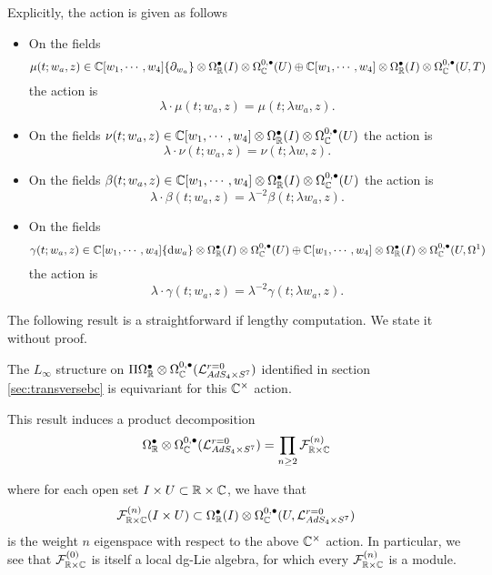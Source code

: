 Explicitly, the action is given as follows 
\begin{itemize}
\item On the fields 
\[
\mu(t; w_a,z) \in \mathbb{C}[w_1, \cdots, w_4]\{\partial_{w_a}\} \otimes \Omega^\bullet_{\mathbb{R}}(I) \otimes \Omega^{0,\bullet}_{\mathbb{C}} (U) \oplus \mathbb{C}[w_1, \cdots, w_4]\otimes \Omega^\bullet_{\mathbb{R}}(I)\otimes \Omega^{0,\bullet}_{\mathbb{C}}(U, T)\] 
the action is
\[
\lambda \cdot \mu(t; w_a,z) = \mu(t; \lambda w_a , z).
\]
\item On the fields $\nu(t; w_a,z) \in \mathbb{C}[w_1, \cdots, w_4] \otimes \Omega^{\bullet}_{\mathbb{R}}(I) \otimes \Omega^{0,\bullet}_{\mathbb{C}}(U)$ the action is
\[
\lambda \cdot \nu(t; w_a,z) = \nu(t; \lambda w , z).
\]
\item On the fields $\beta(t; w_a,z) \in  \mathbb{C}[w_1, \cdots, w_4] \otimes \Omega^{\bullet}_{\mathbb{R}}(I) \otimes \Omega^{0,\bullet}_{\mathbb{C}}(U)$ the action is
\[
\lambda \cdot \beta(t; w_a,z) = \lambda^{-2} \beta(t; \lambda w_a , z).
\]
\item On the fields 
\[
\gamma(t; w_a,z) \in  \mathbb{C}[w_1, \cdots, w_4] \{\mathrm{d} w_a\} \otimes \Omega^{\bullet}_{\mathbb{R}}(I) \otimes\Omega^{0,\bullet}_{\mathbb{C}} (U) \oplus  \mathbb{C}[w_1, \cdots, w_4] \otimes \Omega^{\bullet}_{\mathbb{R}}(I) \otimes\Omega^{0,\bullet}_{\mathbb{C}}(U, \Omega^1)
\] 
the action is
\[
\lambda \cdot \gamma(t; w_a,z) = \lambda^{-2} \gamma(t; \lambda w _a, z).
\]
\end{itemize}

The following result is a straightforward if lengthy computation. We state it without proof.

\begin{prop}\label{prop:ads4decomp}
The $L_\infty$ structure on $\Pi\Omega^\bullet_{\mathbb{R}}\otimes \Omega^{0,\bullet}_{\mathbb{C}} (\mathcal{L}^{r=0}_{AdS_4\times S^7} )$ identified in section \ref{sec:transversebc} is equivariant for this $\mathbb{C}^\times$ action.
\end{prop}

This result induces a product decomposition 
\[
\Omega^\bullet_{\mathbb{R}}\otimes \Omega^{0,\bullet}_{\mathbb{C}} (\mathcal{L}^{r=0}_{AdS_4\times S^7} ) = \prod _{n\geq 2} \mathcal{F}^{(n)}_{\mathbb{R}\times \mathbb{C}}
\]

where for each open set $I\times U\subset\mathbb{R}\times \mathbb{C}$, we have that \[\mathcal{F}_{\mathbb{R}\times \mathbb{C}}^{(n)} (I\times U) \subset \Omega^\bullet_{\mathbb{R}} (I) \otimes \Omega^{0,\bullet}_{\mathbb{C}} (U, \mathcal{L}^{r=0}_{AdS_4\times S^7} )\] is the weight $n$ eigenspace with respect to the above $\mathbb{C}^\times$ action. In particular, we see that $\mathcal{F}^{(0)}_{\mathbb{R}\times \mathbb{C}}$ is itself a local dg-Lie algebra, for which  every $\mathcal{F}^{(n)}_{\mathbb{R}\times \mathbb{C}}$ is a module.

